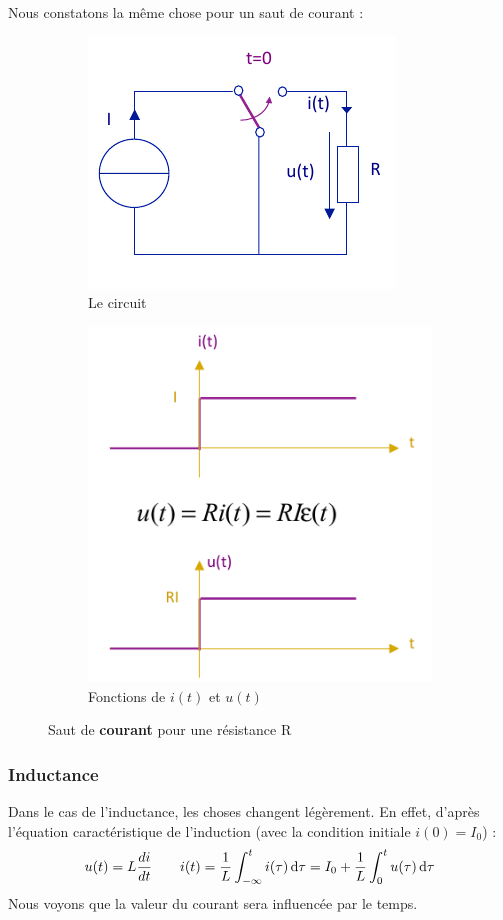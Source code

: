 \documentclass[12pt,a4paper]{article}
\begin{document}
Nous constatons la même chose pour un saut de courant :
\begin{figure}[!h]
	\centering
	\begin{subfigure}[c]{0.45\textwidth}
		\centering
		\includegraphics[scale=0.6]{images/saut_courant_R}
		\caption{Le circuit}
	\end{subfigure}
	\begin{subfigure}[c]{0.45\textwidth}
		\centering
		\includegraphics[scale=0.65]{images/fonctions_saut_courant_R}
		\caption{Fonctions de $i(t)$ et $u(t)$}
	\end{subfigure}
	\caption{Saut de \textbf{courant} pour une résistance R}
\end{figure}

\subsubsection{Inductance}
Dans le cas de l'inductance, les choses changent légèrement. En effet, d'après l'équation caractéristique de l'induction (avec la condition initiale $i(0) = I_0$) :
\begin{equation}
	u(t) = L\frac{di}{dt} \qquad i(t) = \frac{1}{L}\int_{-\infty}^t i(\tau)\, \mathrm d \tau = I_0 + \frac{1}{L}\int_0^t u(\tau)\, \mathrm d \tau
	\label{equ: saut inductance}
\end{equation}
Nous voyons que la valeur du courant sera influencée par le temps.
\end{document}
